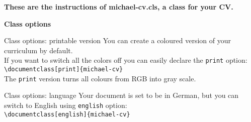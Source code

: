 \documentclass[english]{michael-cv}
\begin{document}
\renewcommand{\CVrightmargin}{150}
\renewcommand{\CVleftmargin}{50}

\renewcommand{\CVProfil}{CV Template}
\renewcommand{\CVCV}{Manual}

\renewcommand{\infoot}{michael-cv.cls}
\renewcommand{\outfoot}{Page~\thepage}
\renewcommand{\leftfoot}{\small Created under the Creative Commons ``Namensnennung 3.0 DE'' License.}

\newcommand{\titolo}[1]{\vspace{2ex}
\textcolor{titlec}{\Large\bf #1}\\[1ex]}

\CVtele{}
\CVcell{}
\CVmail{}
\CVmadd{}
\CVaddr{}
\CVinfo{}
\CVtitle

\begin{para}{}
\bf These are the instructions of michael-cv.cls, a class for your CV.
\end{para}

\vspace{4\baselineskip}
 

\vfill
\titolo{Class options}

\begin{para}{Class options: printable version}
You can create a coloured version of your curriculum by default.\\
If you want to switch all the colors off you can easily declare the \texttt{print} option:\\
\null\hspace{4ex}\verb+\documentclass[print]{michael-cv}+\\[2ex]
The \texttt{print} version turns all colours from RGB into gray scale.
\end{para}

\begin{para}{Class options: language}
Your document is set to be in German, but you can switch to English using \texttt{english} option:\\
\null\hspace{4ex}\verb+\documentclass[english]{michael-cv}+
\end{para}
\end{document}
